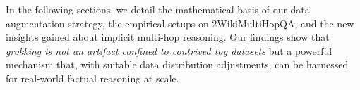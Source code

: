         In the following sections, we detail the mathematical basis of our data augmentation strategy, the empirical setups on 2WikiMultiHopQA, and the new insights gained about implicit multi-hop reasoning. Our findings show that \emph{grokking is not an artifact confined to contrived toy datasets} but a powerful mechanism that, with suitable data distribution adjustments, can be harnessed for real-world factual reasoning at scale.
    